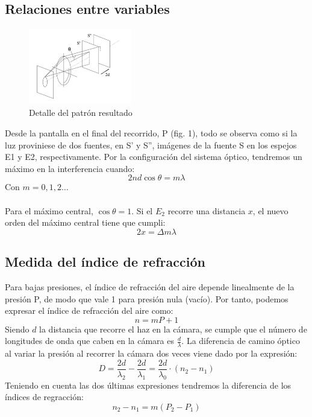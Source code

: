 \documentclass[11pt,letterpaper,twocolumn]{article}
\begin{document}
\subsection{Relaciones entre variables}
\begin{figure}[H]
    \centering
    \includegraphics[width=0.4\textwidth]{img/relvar.png}
    \caption{Detalle del patrón resultado}
    \label{fig:i}
\end{figure}
    Desde la pantalla en el final del recorrido, P (fig. 1), todo se observa como si la luz proviniese de dos fuentes, en S' y S'', imágenes de la fuente S en los espejos E1 y E2, respectivamente. Por la configuración del sistema óptico, tendremos un máximo en la interferencia cuando:
    \begin{equation}
        2nd\cos\theta=m\lambda
    \end{equation}
Con $m=0,1,2\ldots$ \\
\\
Para el máximo central, $\cos \theta =1$. Si el $ E_2$ recorre una distancia $x$, el nuevo orden del máximo central tiene que cumpli:
\begin{equation}
    2x=\Delta m \lambda 
\end{equation}
\subsection{Medida del índice de refracción}
Para bajas presiones, el índice de refracción del aire depende linealmente de la presión P, de modo que vale 1 para presión nula (vacío). Por tanto, podemos expresar el índice de refracción del aire como: 
\begin{equation}
    n=mP+1  
\end{equation}
Siendo $d$ la distancia que recorre el haz en la cámara, se cumple que el número de longitudes de onda que caben en la cámara es $\frac{d}{\lambda}$. La diferencia de camino óptico al variar la presión al recorrer la cámara dos veces viene dado por la expresión:
\begin{equation}
    D=\frac{2d}{\lambda_2}-\frac{2d}{\lambda_1}=\frac{2d}{\lambda_0 }\cdot  \left( n_2-n_1 \right) 
\end{equation}
Teniendo en cuenta las dos últimas expresiones tendremos la diferencia de los índices de regracción:
\begin{equation}
    n_2-n_1=m\left( P_2-P_1 \right) 
\end{equation}
\end{document}
